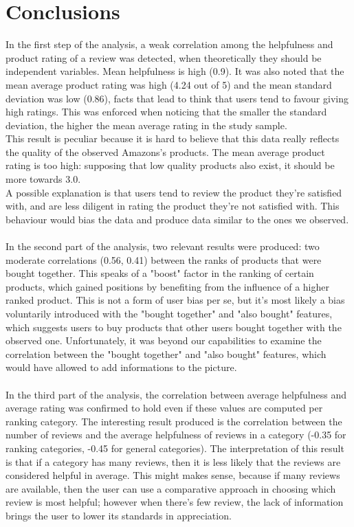 \documentclass[11pt]{article}
\begin{document}
\section{Conclusions}
In the first step of the analysis, a weak correlation among the helpfulness and product rating of a review was detected, when theoretically they should be independent variables. Mean helpfulness is high (0.9). It was also noted that the mean average product rating was high (4.24 out of 5) and the mean standard deviation was low (0.86), facts that lead to think that users tend to favour giving high ratings. This was enforced when noticing that the smaller the standard deviation, the higher the mean average rating in the study sample. \\
This result is peculiar because it is hard to believe that this data really reflects the quality of the observed Amazons's products. The mean average product rating is too high: supposing that low quality products also exist, it should be more towards 3.0. 
\\A possible explanation is that users tend to review the product they're satisfied with, and are less diligent in rating the product they're not satisfied with. This behaviour would bias the data and produce data similar to the ones we observed.\\\\
In the second part of the analysis, two relevant results were produced: two moderate correlations (0.56, 0.41) between the ranks of products that were bought together. This speaks of a "boost" factor in the ranking of certain products, which gained positions by benefiting from the influence of a higher ranked product. This is not a form of user bias per se, but it's most likely  a bias voluntarily introduced with the "bought together" and "also bought" features, which suggests users to buy products that other users bought together with the observed one. Unfortunately, it was beyond our capabilities to examine the correlation between the "bought together" and  "also bought"  features, which would have allowed to add informations to the picture.\\\\
In the third part of the analysis, the correlation between average helpfulness and average rating was confirmed to hold even if these values are computed per ranking category. The interesting result produced is the correlation between the number of reviews and the average helpfulness of reviews in a category (-0.35 for ranking categories, -0.45 for general categories). The interpretation of this result is that if a category has many reviews, then it is less likely that the reviews are considered helpful in average. This might makes sense, because if many reviews are available, then the user can use a comparative approach in choosing which review is most helpful; however when there's few review, the lack of information brings the user to lower its standards in appreciation. \\\\
\end{document}
